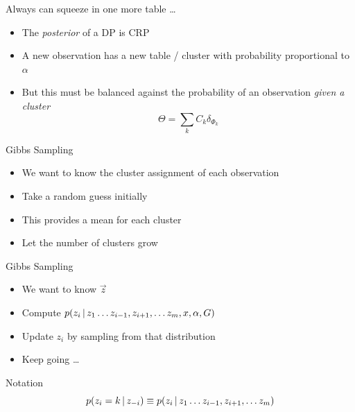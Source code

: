 \documentclass[compress]{beamer}
\begin{document}
\begin{frame}{Always can squeeze in one more table \dots}

	\begin{itemize}
		\item The \emph{posterior} of a DP is CRP
		\item A new observation has a new table / cluster with probability proportional to $\alpha$
		\item But this must be balanced against the probability of an observation \emph{given a cluster}
                  \begin{equation}
                    \Theta = \sum_k C_k \delta_{\Phi_k}
                  \end{equation}

	\end{itemize}

\end{frame}


\begin{frame}{Gibbs Sampling}

	\begin{itemize}
		\item We want to know the cluster assignment of each observation \only<4->{(tables)}
		\item Take a random guess initially
		\pause
		\item This provides a mean for each cluster
		\pause
		\item Let the number of clusters grow
	\end{itemize}

\end{frame}

\begin{frame}{Gibbs Sampling}

	\begin{itemize}
		\item We want to know $\vec z$
		\item Compute $p(z_i \, | \, z_1 \dots z_{i-1}, z_{i+1}, \dots z_m, x, \alpha, G)$
		\item Update $z_i$ by sampling from that distribution
		\item Keep going \dots
	\end{itemize}
	\pause
	\begin{block}{Notation}
		\begin{equation}
			p(z_i = k \, | \, z_{-i}) \equiv p(z_i \, | \, z_1 \dots z_{i-1}, z_{i+1}, \dots z_m)
		\end{equation}
	\end{block}
\end{frame}
\end{document}
